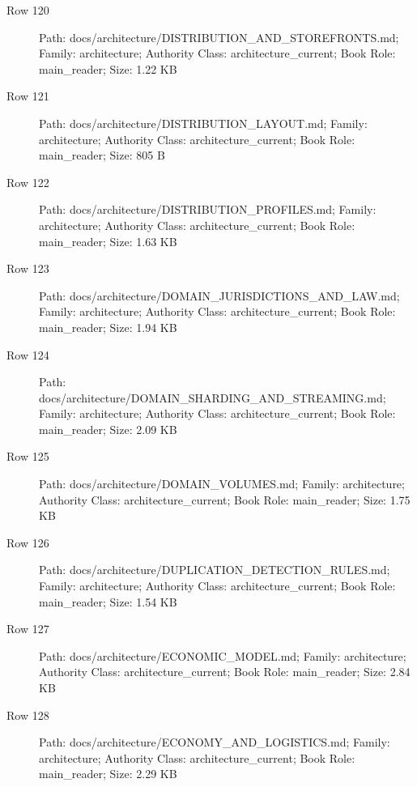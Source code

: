 \documentclass[9pt,a4paper]{book}
\begin{document}
\begin{description}
\item[Row 120] Path: docs/\allowbreak{}architecture/\allowbreak{}DISTRIBUTION\_\allowbreak{}AND\_\allowbreak{}STOREFRONTS.\allowbreak{}md; Family: architecture; Authority Class: architecture\_\allowbreak{}current; Book Role: main\_\allowbreak{}reader; Size: 1.\allowbreak{}22 KB
\item[Row 121] Path: docs/\allowbreak{}architecture/\allowbreak{}DISTRIBUTION\_\allowbreak{}LAYOUT.\allowbreak{}md; Family: architecture; Authority Class: architecture\_\allowbreak{}current; Book Role: main\_\allowbreak{}reader; Size: 805 B
\item[Row 122] Path: docs/\allowbreak{}architecture/\allowbreak{}DISTRIBUTION\_\allowbreak{}PROFILES.\allowbreak{}md; Family: architecture; Authority Class: architecture\_\allowbreak{}current; Book Role: main\_\allowbreak{}reader; Size: 1.\allowbreak{}63 KB
\item[Row 123] Path: docs/\allowbreak{}architecture/\allowbreak{}DOMAIN\_\allowbreak{}JURISDICTIONS\_\allowbreak{}AND\_\allowbreak{}LAW.\allowbreak{}md; Family: architecture; Authority Class: architecture\_\allowbreak{}current; Book Role: main\_\allowbreak{}reader; Size: 1.\allowbreak{}94 KB
\item[Row 124] Path: docs/\allowbreak{}architecture/\allowbreak{}DOMAIN\_\allowbreak{}SHARDING\_\allowbreak{}AND\_\allowbreak{}STREAMING.\allowbreak{}md; Family: architecture; Authority Class: architecture\_\allowbreak{}current; Book Role: main\_\allowbreak{}reader; Size: 2.\allowbreak{}09 KB
\item[Row 125] Path: docs/\allowbreak{}architecture/\allowbreak{}DOMAIN\_\allowbreak{}VOLUMES.\allowbreak{}md; Family: architecture; Authority Class: architecture\_\allowbreak{}current; Book Role: main\_\allowbreak{}reader; Size: 1.\allowbreak{}75 KB
\item[Row 126] Path: docs/\allowbreak{}architecture/\allowbreak{}DUPLICATION\_\allowbreak{}DETECTION\_\allowbreak{}RULES.\allowbreak{}md; Family: architecture; Authority Class: architecture\_\allowbreak{}current; Book Role: main\_\allowbreak{}reader; Size: 1.\allowbreak{}54 KB
\item[Row 127] Path: docs/\allowbreak{}architecture/\allowbreak{}ECONOMIC\_\allowbreak{}MODEL.\allowbreak{}md; Family: architecture; Authority Class: architecture\_\allowbreak{}current; Book Role: main\_\allowbreak{}reader; Size: 2.\allowbreak{}84 KB
\item[Row 128] Path: docs/\allowbreak{}architecture/\allowbreak{}ECONOMY\_\allowbreak{}AND\_\allowbreak{}LOGISTICS.\allowbreak{}md; Family: architecture; Authority Class: architecture\_\allowbreak{}current; Book Role: main\_\allowbreak{}reader; Size: 2.\allowbreak{}29 KB

\end{description}
\end{document}

